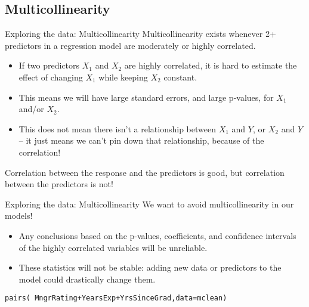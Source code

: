 \documentclass{beamer}\usepackage[]{graphicx}\usepackage[]{color}
\makeatletter
\newcommand{\hlopt}[1]{\textcolor[rgb]{1,0.894,0.769}{#1}}%
\newcommand{\hlstd}[1]{\textcolor[rgb]{1,0.894,0.769}{#1}}%
\newcommand{\hlkwc}[1]{\textcolor[rgb]{0.78,0.941,0.545}{#1}}%
\newcommand{\hlkwd}[1]{\textcolor[rgb]{1,0.78,0.769}{#1}}%
\newenvironment{kframe}{%
 \def\at@end@of@kframe{}%
 \ifinner\ifhmode%
  \def\at@end@of@kframe{\end{minipage}}%
  \begin{minipage}{\columnwidth}%
 \fi\fi%
 \def\FrameCommand##1{\hskip\@totalleftmargin \hskip-\fboxsep
 \colorbox{shadecolor}{##1}\hskip-\fboxsep
     \hskip-\linewidth \hskip-\@totalleftmargin \hskip\columnwidth}%
 \MakeFramed {\advance\hsize-\width
   \@totalleftmargin\z@ \linewidth\hsize
   \@setminipage}}%
 {\par\unskip\endMakeFramed%
 \at@end@of@kframe}
\newenvironment{knitrout}{}{} %
\makeatother
\begin{document}
\begin{darkframes}
    \section{Multicollinearity}

    \begin{frame}[fragile]{Exploring the data: Multicollinearity}
      Multicollinearity exists whenever 2+ predictors in a regression model are moderately or highly correlated. \pause
      \begin{itemize}[<+->]
        \item If two predictors $X_1$ and $X_2$ are highly correlated, it is hard to estimate the effect of changing $X_1$ while keeping $X_2$ constant.
        \item This means we will have large standard errors, and large p-values, for $X_1$ and/or $X_2$.
        \item This \alert{does not} mean there isn't a relationship between $X_1$ and $Y$, or $X_2$ and $Y$ -- it just means we can't pin down that relationship, because of the correlation!
      \end{itemize}
      \pause
      Correlation between the response and the predictors is good, but correlation between the predictors is not!
    \end{frame}

    \begin{frame}[fragile]{Exploring the data: Multicollinearity}
      We want to avoid multicollinearity in our models! \pause
      \begin{itemize}[<+->]
        \item Any conclusions based on the p-values, coefficients, and confidence intervals of the highly correlated variables will be unreliable.
        \item These statistics will not be stable: adding new data or predictors to the model could drastically change them.
      \end{itemize}
    \end{frame}

    \begin{frame}[fragile]%
      \fontsize{9}{9}\selectfont
\begin{knitrout}
\begin{kframe}
\begin{alltt}
\hlkwd{pairs}\hlstd{(}\hlopt{~} \hlstd{MngrRating} \hlopt{+} \hlstd{YearsExp} \hlopt{+} \hlstd{YrsSinceGrad,} \hlkwc{data}\hlstd{=mclean)}
\end{alltt}
\end{kframe}



\end{knitrout}
\end{frame}
\end{darkframes}
\end{document}
